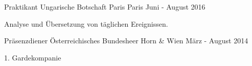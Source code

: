 \begin{cventries}
  \cventry
    {Praktikant} %
    {Ungarische Botschaft Paris} %
    {Paris} %
    {Juni - August 2016} %
    {
    \begin{cvitems}
    \item{Analyse und Übersetzung von täglichen Ereignissen.}
    \end{cvitems}
    }

  \cventry
    {Präsenzdiener} %
    {Österreichisches Bundesheer} %
    {Horn \& Wien} %
    {März - August 2014} %
    {
    \begin{cvitems}
    \item{1. Gardekompanie}
    \end{cvitems}
    }
        
\end{cventries}
